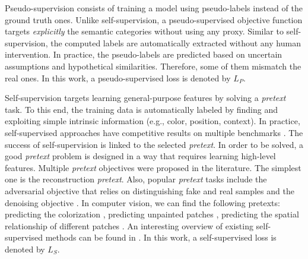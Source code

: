 \documentclass{article}
\begin{document}
Pseudo-supervision consists of training a model using pseudo-labels \cite{paper87} instead of the ground truth ones. Unlike self-supervision, a pseudo-supervised objective function targets \textit{explicitly} the semantic categories without using any proxy. Similar to self-supervision, the computed labels are automatically extracted without any human intervention. In practice, the pseudo-labels are predicted based on uncertain assumptions and hypothetical similarities. Therefore, some of them mismatch the real ones. In this work, a pseudo-supervised loss is denoted by $L_{P}$.

Self-supervision targets learning general-purpose features by solving a \textit{pretext} task. To this end, the training data is automatically labeled by finding and exploiting simple intrinsic information (e.g., color, position, context). In practice, self-supervised approaches have competitive results on multiple benchmarks \cite{paper60, paper93}. The success of self-supervision is linked to the selected \textit{pretext}. In order to be solved, a good \textit{pretext} problem is designed in a way that requires learning high-level features. Multiple \textit{pretext} objectives were proposed in the literature. The simplest one is the reconstruction \textit{pretext}. Also, popular \textit{pretext} tasks include the adversarial objective \cite{paper1} that relies on distinguishing fake and real samples and the denoising objective \cite{paper58}. In computer vision, we can find the following pretexts: predicting the colorization \cite{paper63}, predicting unpainted patches \cite{paper62}, predicting the spatial relationship of different patches \cite{paper59}. An interesting overview of existing self-supervised methods can be found in \cite{paper94}. In this work, a self-supervised loss is denoted by $L_{S}$.
\end{document}
